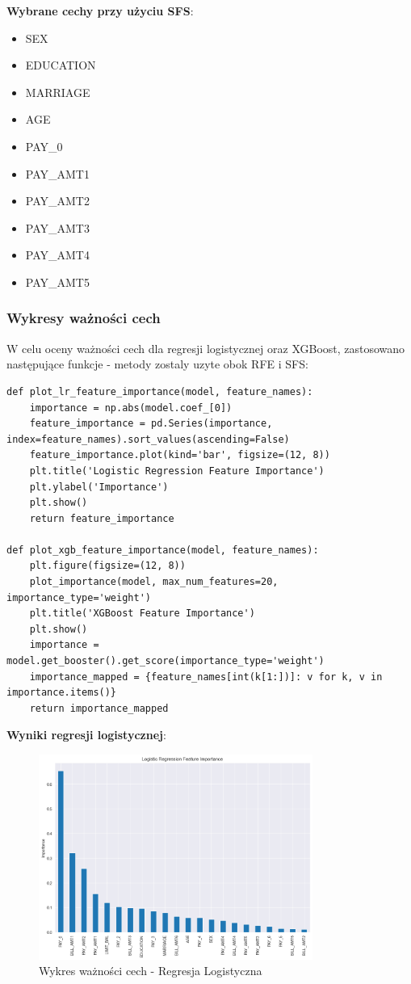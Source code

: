 \documentclass{article}
\begin{document}
\textbf{Wybrane cechy przy użyciu SFS}:
\begin{itemize}
    \item SEX
    \item EDUCATION
    \item MARRIAGE
    \item AGE
    \item PAY\_0
    \item PAY\_AMT1
    \item PAY\_AMT2
    \item PAY\_AMT3
    \item PAY\_AMT4
    \item PAY\_AMT5
\end{itemize}

\subsubsection{Wykresy ważności cech}

W celu oceny ważności cech dla regresji logistycznej oraz XGBoost, zastosowano następujące funkcje - metody zostaly uzyte obok RFE i SFS:

\begin{verbatim}
def plot_lr_feature_importance(model, feature_names):
    importance = np.abs(model.coef_[0])
    feature_importance = pd.Series(importance, index=feature_names).sort_values(ascending=False)
    feature_importance.plot(kind='bar', figsize=(12, 8))
    plt.title('Logistic Regression Feature Importance')
    plt.ylabel('Importance')
    plt.show()
    return feature_importance

def plot_xgb_feature_importance(model, feature_names):
    plt.figure(figsize=(12, 8))
    plot_importance(model, max_num_features=20, importance_type='weight')
    plt.title('XGBoost Feature Importance')
    plt.show()
    importance = model.get_booster().get_score(importance_type='weight')
    importance_mapped = {feature_names[int(k[1:])]: v for k, v in importance.items()}
    return importance_mapped
\end{verbatim}

\textbf{Wyniki regresji logistycznej}:
\begin{figure}[H]
    \centering
    \includegraphics[width=0.8\textwidth]{./lr_importance.png}
    \caption{Wykres ważności cech - Regresja Logistyczna}
    \label{fig:lr_feature_importance}
\end{figure}
\end{document}
